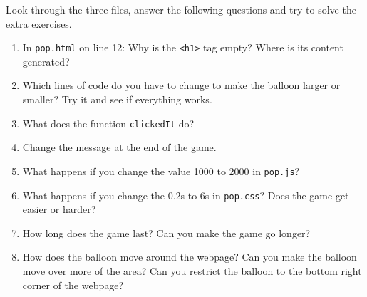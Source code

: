 \documentclass[english,11pt,a4paper]{report}
\begin{document}
\begin{ex} Look through the three files, answer the following questions and try to solve the extra exercises.
\begin{enumerate}
\item In \verb|pop.html| on line 12: Why is the \verb|<h1>| tag empty? Where is its content generated?
\item Which lines of code do you have to change to make the balloon larger or smaller? Try it and see if everything works.
\item What does the function \verb|clickedIt| do?
\item Change the message at the end of the game.
\item What happens if you change the value 1000 to 2000 in \verb|pop.js|?
\item What happens if you change the 0.2s to 6s in \verb|pop.css|? Does the game get easier or harder?
\item How long does the game last? Can you make the game go longer?
\item How does the balloon move around the webpage? Can you make the balloon move over more of the area? Can you restrict the balloon to the bottom right corner of the webpage?
\end{enumerate}
\end{ex}
\end{document}
